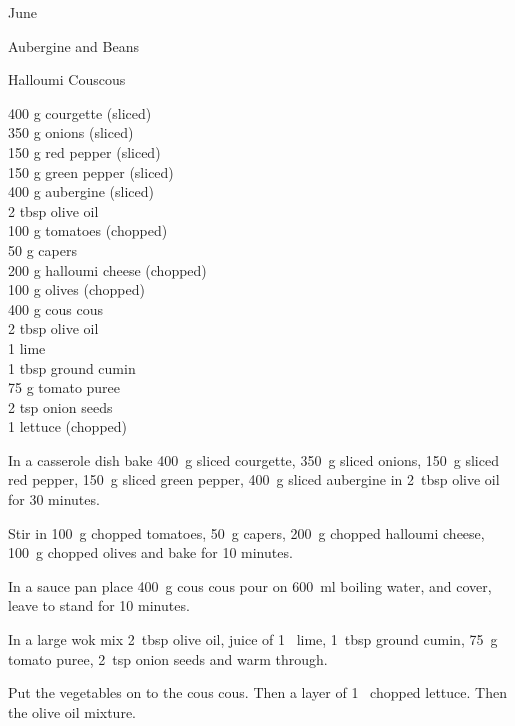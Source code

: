 \begin{menu}{June}
\begin{recipe}{2}{Aubergine and Beans}
\begin{instructions}
    \end{instructions}
    \end{recipe}%
  
    \begin{recipe}{2}{Halloumi Couscous}%
		\begin{ingredients}
		400 g courgette (sliced) \\
	350 g onions (sliced) \\
	150 g red pepper (sliced) \\
	150 g green pepper (sliced) \\
	400 g aubergine (sliced) \\
	2 tbsp olive oil  \\
	100 g tomatoes (chopped) \\
	50 g capers  \\
	200 g halloumi cheese (chopped) \\
	100 g olives (chopped) \\
	400 g cous cous  \\
	2 tbsp olive oil  \\
	1  lime  \\
	1 tbsp ground cumin  \\
	75 g tomato puree  \\
	2 tsp onion seeds  \\
	1  lettuce (chopped) \\
	
		\end{ingredients}
	
	
    \begin{instructions}
    \item 
        In a casserole dish bake
        400~g sliced courgette,
        350~g sliced onions,
        150~g sliced red pepper,
        150~g sliced green pepper,
        400~g sliced aubergine
        in
        2~tbsp  olive oil
        for 30 minutes.
      \item 
        Stir in
        100~g chopped tomatoes,
        50~g  capers,
        200~g chopped halloumi cheese,
        100~g chopped olives
        and bake for 10 minutes.
      \item 
    In a
    sauce pan 
    place
    400~g  cous cous
    pour on
    600~ml  boiling water,
    and cover, leave to stand for 10 minutes.
  \item 
        In a large wok mix
        2~tbsp  olive oil,
        juice of
        1~  lime,
        1~tbsp  ground cumin,
        75~g  tomato puree,
        2~tsp  onion seeds
        and warm through.
      \item 
        Put the vegetables on to the cous cous.
        Then a layer of
        1~ chopped lettuce.
        Then the olive oil mixture.
      

\end{instructions}
\end{recipe}
\end{menu}
